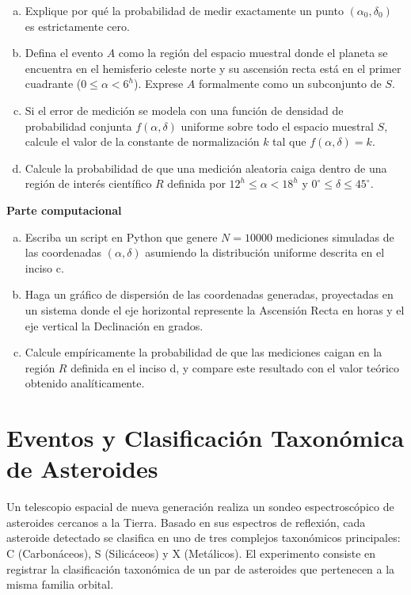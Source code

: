 \documentclass[a4paper]{article}
\begin{document}
\begin{enumerate}[a)]
\item Explique por qué la probabilidad de medir exactamente un punto $(\alpha_0, \delta_0)$ es estrictamente cero.
\item Defina el evento $A$ como la región del espacio muestral donde el planeta se encuentra en el hemisferio celeste norte y su ascensión recta está en el primer cuadrante ($0 \leq \alpha < 6^h$). Exprese $A$ formalmente como un subconjunto de $S$.
\item Si el error de medición se modela con una función de densidad de probabilidad conjunta $f(\alpha, \delta)$ uniforme sobre todo el espacio muestral $S$, calcule el valor de la constante de normalización $k$ tal que $f(\alpha, \delta) = k$.
\item Calcule la probabilidad de que una medición aleatoria caiga dentro de una región de interés científico $R$ definida por $12^h \leq \alpha < 18^h$ y $0^\circ \leq \delta \leq 45^\circ$.
\end{enumerate}

\textbf{Parte computacional}
\begin{enumerate}[a)]
\item Escriba un script en Python que genere $N = 10000$ mediciones simuladas de las coordenadas $(\alpha, \delta)$ asumiendo la distribución uniforme descrita en el inciso c.
\item Haga un gráfico de dispersión de las coordenadas generadas, proyectadas en un sistema donde el eje horizontal represente la Ascensión Recta en horas y el eje vertical la Declinación en grados.
\item Calcule empíricamente la probabilidad de que las mediciones caigan en la región $R$ definida en el inciso d, y compare este resultado con el valor teórico obtenido analíticamente.
\end{enumerate}


\section{Eventos y Clasificación Taxonómica de Asteroides}
\label{sec:problema-05}

Un telescopio espacial de nueva generación realiza un sondeo espectroscópico de asteroides cercanos a la Tierra. Basado en sus espectros de reflexión, cada asteroide detectado se clasifica en uno de tres complejos taxonómicos principales: C (Carbonáceos), S (Silicáceos) y X (Metálicos). El experimento consiste en registrar la clasificación taxonómica de un par de asteroides que pertenecen a la misma familia orbital. 
\end{document}
